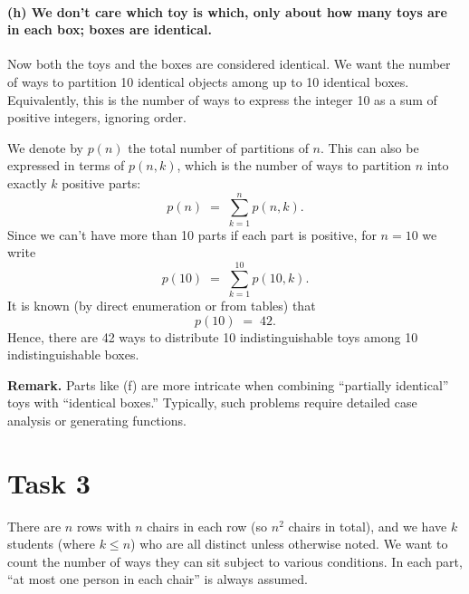 \documentclass[docmute]{article}
\begin{document}
\paragraph{(h) We don’t care which toy is which, only about how many toys are in each box; boxes are identical.}
Now both the toys and the boxes are considered identical. We want the number of ways to partition 10 identical objects among up to 10 identical boxes. Equivalently, this is the number of ways to express the integer 10 as a sum of positive integers, ignoring order. 

We denote by \(p(n)\) the total number of partitions of \(n\). This can also be expressed in terms of \(p(n,k)\), which is the number of ways to partition \(n\) into exactly \(k\) positive parts:
\[
p(n) \;=\; \sum_{k=1}^{n} p(n,k).
\]
Since we can’t have more than 10 parts if each part is positive, for \(n=10\) we write
\[
p(10) 
\;=\;
\sum_{k=1}^{10} p(10,k).
\]
It is known (by direct enumeration or from tables) that
\[
p(10) \;=\; 42.
\]
Hence, there are 42 ways to distribute 10 indistinguishable toys among 10 indistinguishable boxes.

\bigskip
\noindent
\textbf{Remark.} Parts like (f) are more intricate when combining “partially identical” toys with “identical boxes.” Typically, such problems require detailed case analysis or generating functions.

\section{Task 3}

There are \(n\) rows with \(n\) chairs in each row (so \(n^2\) chairs in total), and we have \(k\) students (where \(k \le n\)) who are all distinct unless otherwise noted. We want to count the number of ways they can sit subject to various conditions. In each part, “at most one person in each chair” is always assumed.
\end{document}
